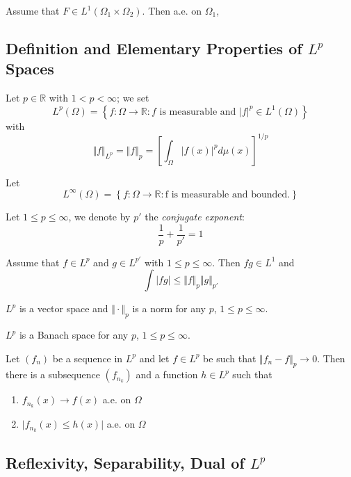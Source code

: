 \begin{thm}[Fubini]
	Assume that $ F \in L^{1}( \Omega_{1} \times \Omega_{2}) $. Then a.e. on $ \Omega_{1} $, 
\end{thm}

\subsection{Definition and Elementary Properties of $ L^{p} $ Spaces}
\begin{defn}
Let $ p \in \mathbb{R} $ with $ 1 < p < \infty$; we set
\[
	L^{p}( \Omega) = \left\{ f: \Omega \to \mathbb{R}: f \text{ is measurable and } \vert f \vert^{p} \in L^{1}( \Omega) \right\}
\]
with
\[
	\Vert f \Vert_{L^{p}} = \Vert f \Vert_{p} = \left[ \int_{ \Omega} \vert f(x) \vert^{p} d \mu (x) \right]^{1/p}
\]

\end{defn}

\begin{defn}
Let
\[
	L^{\infty} ( \Omega ) = \left\{ f: \Omega \to \mathbb{R}: \text{f is measurable and bounded.} \right\}
\]


\end{defn}

\begin{defn}
Let $ 1 \leq p \leq \infty $, we denote by $ p' $ the \textit{conjugate exponent}:
\[
\frac{1}{p} + \frac{1}{p'} =1
\]

\end{defn}

\begin{thm}
	Assume that $ f \in L^{p} $ and $  g \in L^{p'} $ with $ 1 \leq p \leq \infty $. Then $ fg \in L^{1} $ and
	\[
	\int \vert fg \vert \leq \Vert f \Vert_{p} \Vert g \Vert_{p'}
	\]
	
\end{thm}

\begin{thm}
$ L^{p} $ is a vector space and $ \Vert \cdot \Vert_{p} $ is a norm for any $ p $, $ 1 \leq p \leq \infty $.
\end{thm}

\begin{thm}
$ L^{p} $ is a Banach space for any $ p $, $ 1 \leq p \leq \infty $.
\end{thm}

\begin{thm}
	Let $ (f_{n}) $ be a sequence in $ L^{p} $ and let $ f \in L^{p} $ be such that $ \Vert f_{n} - f \Vert_{p} \to 0$. Then there is a subsequence $ (f_{n_{k}}) $ and a function $ h \in L^{p} $ such that
	\begin{enumerate}
		\item $ f_{n_{k}}(x) \to f(x) $ a.e. on $ \Omega $
		\item $ \vert f_{n_{k}}(x) \leq h(x) \vert $ a.e. on $ \Omega $
	\end{enumerate}
\end{thm}

\subsection{Reflexivity, Separability, Dual of $ L^{p} $}


